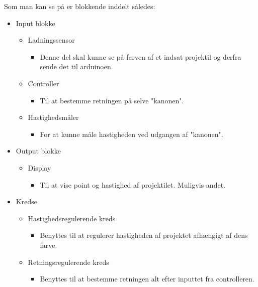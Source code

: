 Som man kan se på  er blokkende inddelt således:
\begin{itemize}
	\item Input blokke
	\begin{itemize}
		\item Ladningssensor
		\begin{itemize}
			\item Denne del skal kunne se på farven af et indsat projektil og derfra sende det til arduinoen.
		\end{itemize}
		\item Controller
		\begin{itemize}
			\item Til at bestemme retningen på selve "kanonen".
		\end{itemize}
		\item Hastighedsmåler
		\begin{itemize}
			\item For at kunne måle hastigheden ved udgangen af "kanonen".
		\end{itemize}
	\end{itemize}
	\item Output blokke
	\begin{itemize}
		\item Display
		\begin{itemize}
			\item Til at vise point og hastighed af projektilet. Muligvis andet.
		\end{itemize}
	\end{itemize}
	\item Kredse
	\begin{itemize}
		\item Hastighedsregulerende kreds
		\begin{itemize}
			\item Benyttes til at regulerer hastigheden af projektet afhængigt af dens farve.
		\end{itemize}
		\item Retningsregulerende kreds
		\begin{itemize}
			\item Benyttes til at bestemme retningen alt efter inputtet fra controlleren.
		\end{itemize}
	\end{itemize}
\end{itemize}



